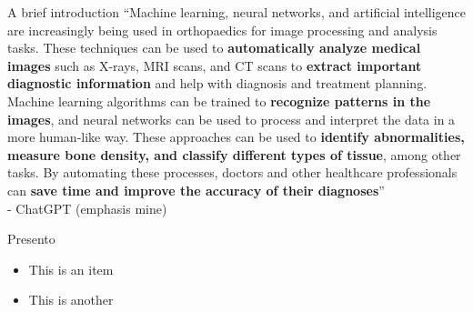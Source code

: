 \begin{frame}{A brief introduction}
   ``Machine learning, neural networks, and artificial intelligence are increasingly being used in orthopaedics for image processing and analysis tasks. These techniques can be used to {\bf automatically analyze medical images} such as X-rays, MRI scans, and CT scans to {\bf extract important diagnostic information} and help with diagnosis and treatment planning. Machine learning algorithms can be trained to {\bf recognize patterns in the images}, and neural networks can be used to process and interpret the data in a more human-like way. These approaches can be used to {\bf identify abnormalities, measure bone density, and classify different types of tissue}, among other tasks. By automating these processes, doctors and other healthcare professionals can {\bf save time and improve the accuracy of their diagnoses}'' \\
\vspace{5mm}
   \hfill - ChatGPT (emphasis mine)
\end{frame}










\begin{frame}{Presento}
 \begin{fullpageitemize}
  \item \begin{center}\end{center}
  \item \begin{center}\end{center}
  \item \begin{center}\end{center}
 \end{fullpageitemize}
\end{frame}

\begin{frame}
   \begin{itemize}
      \item This is an item
      \item This is another
   \end{itemize}
\end{frame}

